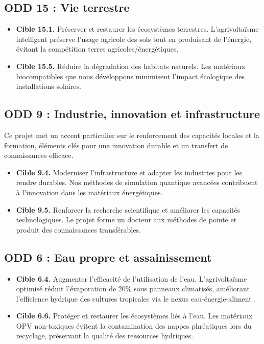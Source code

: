 \documentclass[12pt, a4paper]{article}
\begin{document}
\subsection{ODD 15 : Vie terrestre}

\begin{itemize}
    \item \textbf{Cible 15.1.} Préserver et restaurer les écosystèmes terrestres. L'agrivoltaïsme intelligent préserve l'usage agricole des sols tout en produisant de l'énergie, évitant la compétition terres agricoles/énergétiques.
    \item \textbf{Cible 15.5.} Réduire la dégradation des habitats naturels. Les matériaux biocompatibles que nous développons minimisent l'impact écologique des installations solaires.
\end{itemize}

\subsection{ODD 9 : Industrie, innovation et infrastructure}

Ce projet met un accent particulier sur le renforcement des capacités locales et la formation, éléments clés pour une innovation durable et un transfert de connaissances efficace.
\begin{itemize}
    \item \textbf{Cible 9.4.} Moderniser l'infrastructure et adapter les industries pour les rendre durables. Nos méthodes de simulation quantique avancées contribuent à l'innovation dans les matériaux énergétiques.
    \item \textbf{Cible 9.5.} Renforcer la recherche scientifique et améliorer les capacités technologiques. Le projet forme un docteur aux méthodes de pointe et produit des connaissances transférables.
\end{itemize}

\subsection{ODD 6 : Eau propre et assainissement}

\begin{itemize}
    \item \textbf{Cible 6.4.} Augmenter l'efficacité de l'utilisation de l'eau. L'agrivoltaïsme optimisé réduit l'évaporation de 20\% sous panneaux climatisés, améliorant l'efficience hydrique des cultures tropicales via le nexus eau-énergie-aliment \cite{Rapella2025}.
    \item \textbf{Cible 6.6.} Protéger et restaurer les écosystèmes liés à l'eau. Les matériaux OPV non-toxiques évitent la contamination des nappes phréatiques lors du recyclage, préservant la qualité des ressources hydriques.
\end{itemize}
\end{document}
